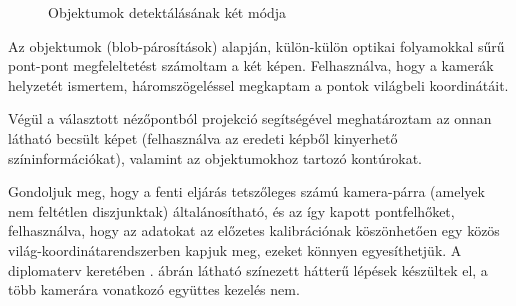 \begin{figure}[tbh]

\caption{Objektumok detektálásának két módja \label{fig:plan-objects}}
\end{figure}


Az objektumok (blob-párosítások) alapján, külön-külön optikai folyamokkal sűrű pont-pont megfeleltetést számoltam a két képen. Felhasználva, hogy a kamerák helyzetét ismertem, háromszögeléssel megkaptam a pontok világbeli koordinátáit.

Végül a választott nézőpontból projekció segítségével meghatároztam az onnan látható becsült képet (felhasználva az eredeti képből kinyerhető színinformációkat), valamint az objektumokhoz tartozó kontúrokat.

Gondoljuk meg, hogy a fenti eljárás tetszőleges számú kamera-párra (amelyek nem feltétlen diszjunktak) általánosítható, és az így kapott pontfelhőket, felhasználva, hogy az adatokat az előzetes kalibrációnak köszönhetően egy közös világ-koordinátarendszerben kapjuk meg, ezeket könnyen egyesíthetjük. A diplomaterv keretében . ábrán látható színezett hátterű lépések készültek el, a több kamerára vonatkozó együttes kezelés nem.

